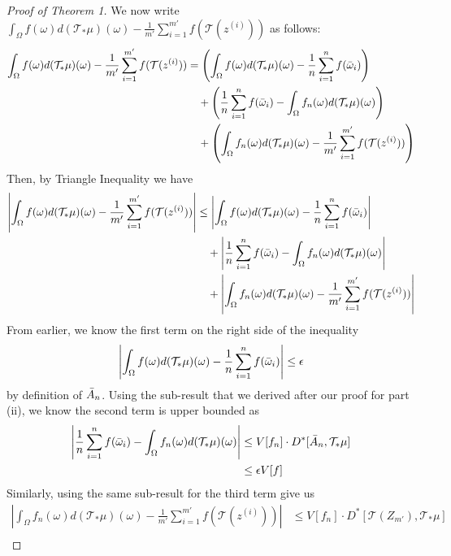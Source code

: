 \documentclass{article}
\begin{document}
\begin{proof}[Proof of Theorem 1]
    We now write $\int_{\Omega} f(\omega) d(\mathcal{T}_{*}\mu)(\omega) -  \frac{1}{m'} \sum_{i=1}^{m'} f(\mathcal{T}(z^{(i)}))$ as follows:
    \begin{align*}
        \int_{\Omega} f(\omega) d(\mathcal{T}_{*}\mu)(\omega) -  \frac{1}{m'} \sum_{i=1}^{m'} f(\mathcal{T}(z^{(i)})) & = \left( \int_{\Omega} f(\omega) d(\mathcal{T}_{*}\mu)(\omega) - \frac{1}{n} \sum_{i=1}^{n} f(\Bar{\omega}_i) \right) \\
        & \quad + \left( \frac{1}{n}\sum_{i=1}^{n} f(\Bar{\omega}_i) - \int_{\Omega} f_n (\omega) d(\mathcal{T}_{*}\mu)(\omega) \right) \\
        & \quad + \left( \int_{\Omega} f_n (\omega) d(\mathcal{T}_{*}\mu)(\omega) - \frac{1}{m'} \sum_{i=1}^{m'} f(\mathcal{T}(z^{(i)})) \right)
    \end{align*}
    Then, by Triangle Inequality we have
    \begin{align*}
        \left| \int_{\Omega} f(\omega) d(\mathcal{T}_{*}\mu)(\omega) -  \frac{1}{m'} \sum_{i=1}^{m'} f(\mathcal{T}(z^{(i)})) \right| & \leq \left| \int_{\Omega} f(\omega) d(\mathcal{T}_{*}\mu)(\omega) - \frac{1}{n} \sum_{i=1}^{n} f(\Bar{\omega}_i) \right| \\
        & \quad + \left| \frac{1}{n}\sum_{i=1}^{n} f(\Bar{\omega}_i) - \int_{\Omega} f_n (\omega) d(\mathcal{T}_{*}\mu)(\omega) \right| \\
        & \quad + \left| \int_{\Omega} f_n (\omega) d(\mathcal{T}_{*}\mu)(\omega) - \frac{1}{m'} \sum_{i=1}^{m'} f(\mathcal{T}(z^{(i)})) \right|
    \end{align*}
    From earlier, we know the first term on the right side of the inequality
    \[\left| \int_{\Omega} f(\omega) d(\mathcal{T}_{*}\mu)(\omega) - \frac{1}{n} \sum_{i=1}^{n} f(\Bar{\omega}_i) \right| \leq \epsilon\]
    by definition of $\Bar{A}_n$. Using the sub-result that we derived after our proof for part (ii), we know the second term is upper bounded as
    \begin{align*}
        \left| \frac{1}{n}\sum_{i=1}^{n} f(\Bar{\omega}_i) - \int_{\Omega} f_n (\omega) d(\mathcal{T}_{*}\mu)(\omega) \right| & \leq V[f_n] \cdot  D^*[\Bar{A}_n, \mathcal{T}_{*}\mu] \\
        & \leq \epsilon V[f]
    \end{align*}
    Similarly, using the same sub-result for the third term give us
    \begin{align*}
        \left| \int_{\Omega} f_n (\omega) d(\mathcal{T}_{*}\mu)(\omega) - \frac{1}{m'} \sum_{i=1}^{m'} f(\mathcal{T}(z^{(i)})) \right| & \leq V[f_n] \cdot  D^*[\mathcal{T}(Z_{m'}), \mathcal{T}_{*}\mu] \\

\end{align*}
\end{proof}
\end{document}
